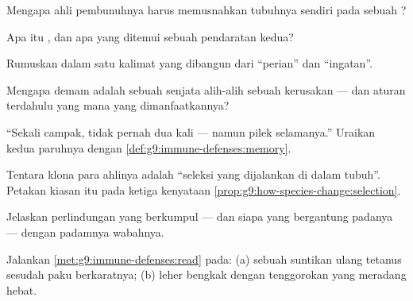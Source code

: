\begin{exercise}[$\star$]\label{exo:g9:immune-defenses:4}
Mengapa ahli pembunuhnya harus memusnahkan  tubuhnya
sendiri pada sebuah  ?
\end{exercise}

\begin{exercise}[$\star$]\label{exo:g9:immune-defenses:5}
Apa itu , dan apa yang ditemui sebuah pendaratan
kedua?
\end{exercise}

\begin{exercise}[$\star$]\label{exo:g9:immune-defenses:6}
Rumuskan  dalam satu kalimat yang dibangun dari
``perian'' dan ``ingatan''.
\end{exercise}

\begin{exercise}[$\star\star$]\label{exo:g9:immune-defenses:7}
Mengapa demam adalah sebuah senjata alih-alih sebuah
kerusakan --- dan aturan  terdahulu yang mana yang
dimanfaatkannya?
\end{exercise}

\begin{exercise}[$\star\star$]\label{exo:g9:immune-defenses:8}
``Sekali campak, tidak pernah dua kali --- namun pilek
selamanya.'' Uraikan kedua paruhnya dengan
\cref{def:g9:immune-defenses:memory}.
\end{exercise}

\begin{exercise}[$\star\star$]\label{exo:g9:immune-defenses:9}
Tentara klona para ahlinya adalah ``seleksi yang dijalankan
di dalam tubuh''. Petakan kiasan itu pada ketiga kenyataan
\cref{prop:g9:how-species-change:selection}.
\end{exercise}

\begin{exercise}[$\star\star$]\label{exo:g9:immune-defenses:10}
Jelaskan perlindungan yang berkumpul --- dan siapa yang
bergantung padanya --- dengan padamnya wabahnya.
\end{exercise}

\begin{exercise}[$\star\star$]\label{exo:g9:immune-defenses:11}
Jalankan \cref{met:g9:immune-defenses:read} pada: (a) sebuah
suntikan ulang tetanus sesudah paku berkaratnya; (b)
 leher bengkak dengan tenggorokan yang meradang hebat.
\end{exercise}

